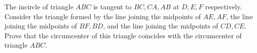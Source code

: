 The incircle of triangle $ABC$ is tangent to $BC,CA,AB$ at $D,E,F$ respectively. Consider the triangle formed by the line joining the midpoints of $AE,AF$, the line joining the midpoints of $BF,BD$, and the line joining the midpoints of $CD,CE$. Prove that the circumcenter of this triangle coincides with the circumcenter of triangle $ABC$.